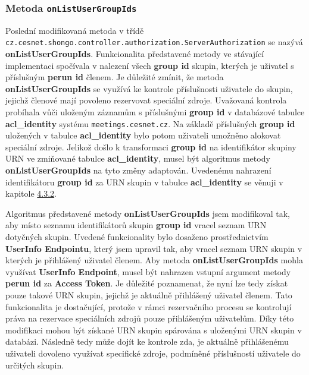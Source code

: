 \documentclass[
  printed, %
  twoside, %
  table,   %
  nolof,     %
  nolot,     %
]{fithesis3}
\begin{document}
\subsubsection{Metoda \texttt{onListUserGroupIds}}
Poslední modifikovaná metoda v třídě \texttt{cz.cesnet.shongo.controller.authorization.ServerAuthorization} se nazývá \textbf{onListUserGroupIds}. Funkcionalita představené metody ve stávající implementaci spočívala v nalezení všech \textbf{group id} skupin, kterých je uživatel s příslušným \textbf{perun id} členem. Je důležité zmínit, že metoda \textbf{onListUserGroupIds} se využívá ke kontrole příslušnosti uživatele do skupin, jejichž členové mají povoleno rezervovat speciální zdroje. Uvažovaná kontrola probíhala vůči uloženým záznamům s příslušnými \textbf{group id} v databázové tabulce \textbf{acl\_identity} systému \texttt{meetings.cesnet.cz}. Na základě příslušných \textbf{group id} uložených v tabulce \textbf{acl\_identity} bylo potom uživateli umožněno alokovat speciální zdroje. Jelikož došlo k transformaci \textbf{group id} na identifikátor skupiny URN ve zmiňované tabulce \textbf{acl\_identity}, musel být algoritmus metody \textbf{onListUserGroupIds} na tyto změny adaptován. Uvedenému nahrazení identifikátoru \textbf{group id} za URN skupin v tabulce \textbf{acl\_identity} se věnuji v kapitole \hyperref[zpracovaniAUlozeniPerun]{4.3.2}. 
\par
Algoritmus představené metody \textbf{onListUserGroupIds} jsem modifikoval tak, aby místo seznamu identifikátorů skupin \textbf{group id} vracel seznam URN dotyčných skupin. Uvedené funkcionality bylo dosaženo prostřednictvím \textbf{UserInfo Endpointu}, který jsem upravil tak, aby vracel seznam URN skupin v kterých je přihlášený uživatel členem. Aby metoda \textbf{onListUserGroupIds} mohla využívat \textbf{UserInfo Endpoint}, musel být nahrazen vstupní argument metody \textbf{perun id} za \textbf{Access Token}. Je důležité poznamenat, že nyní lze tedy získat pouze takové URN skupin, jejichž je aktuálně přihlášený uživatel členem. Tato funkcionalita je dostačující, protože v rámci rezervačního procesu se kontrolují práva na rezervace speciálních zdrojů pouze přihlášeným uživatelům. Díky této modifikaci mohou být získané URN skupin spárována s uloženými URN skupin v databázi. Následně tedy může dojít ke kontrole zda, je aktuálně přihlášenému uživateli dovoleno využívat specifické zdroje, podmíněné příslušností uživatele do určitých skupin.

\par
\end{document}
